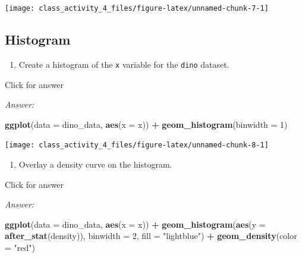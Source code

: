 \documentclass[
]{book}
\newenvironment{Shaded}{\begin{snugshade}}{\end{snugshade}}
\newcommand{\AttributeTok}[1]{\textcolor[rgb]{0.13,0.29,0.53}{#1}}
\newcommand{\DecValTok}[1]{\textcolor[rgb]{0.00,0.00,0.81}{#1}}
\newcommand{\FunctionTok}[1]{\textcolor[rgb]{0.13,0.29,0.53}{\textbf{#1}}}
\newcommand{\NormalTok}[1]{#1}
\newcommand{\SpecialCharTok}[1]{\textcolor[rgb]{0.81,0.36,0.00}{\textbf{#1}}}
\newcommand{\StringTok}[1]{\textcolor[rgb]{0.31,0.60,0.02}{#1}}
\providecommand{\tightlist}{%
  \setlength{\itemsep}{0pt}\setlength{\parskip}{0pt}}
\begin{document}
\texttt{[image: class\_activity\_4\_files/figure-latex/unnamed-chunk-7-1]}

\hypertarget{histogram}{%
\subsection{Histogram}\label{histogram}}

\begin{enumerate}
\def\labelenumi{\alph{enumi}.}
\tightlist
\item
  Create a histogram of the \texttt{x} variable for the \texttt{dino} dataset.
\end{enumerate}

Click for answer

\emph{Answer:}

\begin{Shaded}
\begin{Highlighting}[]
\FunctionTok{ggplot}\NormalTok{(}\AttributeTok{data =}\NormalTok{ dino\_data, }\FunctionTok{aes}\NormalTok{(}\AttributeTok{x =}\NormalTok{ x)) }\SpecialCharTok{+}
  \FunctionTok{geom\_histogram}\NormalTok{(}\AttributeTok{binwidth =} \DecValTok{1}\NormalTok{) }
\end{Highlighting}
\end{Shaded}

\texttt{[image: class\_activity\_4\_files/figure-latex/unnamed-chunk-8-1]}

\begin{enumerate}
\def\labelenumi{\alph{enumi}.}
\setcounter{enumi}{1}
\tightlist
\item
  Overlay a density curve on the histogram.
\end{enumerate}

Click for answer

\emph{Answer:}

\begin{Shaded}
\begin{Highlighting}[]
\FunctionTok{ggplot}\NormalTok{(}\AttributeTok{data =}\NormalTok{ dino\_data, }\FunctionTok{aes}\NormalTok{(}\AttributeTok{x =}\NormalTok{ x)) }\SpecialCharTok{+}
  \FunctionTok{geom\_histogram}\NormalTok{(}\FunctionTok{aes}\NormalTok{(}\AttributeTok{y =} \FunctionTok{after\_stat}\NormalTok{(density)), }\AttributeTok{binwidth =} \DecValTok{2}\NormalTok{, }\AttributeTok{fill =} \StringTok{"lightblue"}\NormalTok{) }\SpecialCharTok{+}
  \FunctionTok{geom\_density}\NormalTok{(}\AttributeTok{color =} \StringTok{"red"}\NormalTok{)}
\end{Highlighting}
\end{Shaded}
\end{document}
